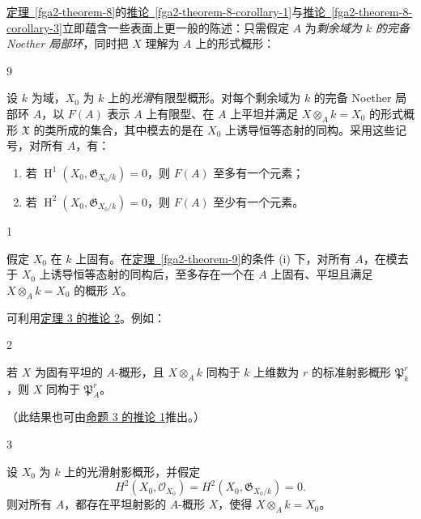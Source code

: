 \par{}\hyperref[fga2-theorem-8]{定理~\ref*{fga2-theorem-8}}的\hyperref[fga2-theorem-8-corollary-1]{推论~\ref*{fga2-theorem-8-corollary-1}}与\hyperref[fga2-theorem-8-corollary-3]{推论~\ref*{fga2-theorem-8-corollary-3}}立即蕴含一些表面上更一般的陈述：只需假定 \(A\) 为\emph{剩余域为 \(k\) 的完备 Noether 局部环}，同时把 \(X\) 理解为 \(A\) 上的形式概形：
\begin{theorem}{9}\label{fga2-theorem-9}\skipsinglepar
\par{}设 \(k\) 为域，\(X_0\) 为 \(k\) 上的\emph{光滑}有限型概形。对每个剩余域为 \(k\) 的完备 Noether 局部环 \(A\)，以 \(F(A)\) 表示 \(A\) 上有限型、在 \(A\) 上平坦并满足 \(X\otimes _Ak=X_0\) 的形式概形 \(\mathfrak {X}\) 的类所成的集合，其中模去的是在 \(X_0\) 上诱导恒等态射的同构。采用这些记号，对所有 \(A\)，有：
\begin{enumerate}
      
 \item[i.]若 \(\operatorname {H}^1(X_0,\mathfrak {G}_{X_0/k})=0\)，则 \(F(A)\) 至多有一个元素；

      
 \item[ii.]若 \(\operatorname {H}^2(X_0,\mathfrak {G}_{X_0/k})=0\)，则 \(F(A)\) 至少有一个元素。

    \end{enumerate}\end{theorem}
\begin{corollary}{1}\label{fga2-theorem-9-corollary-1}\skipsinglepar
\par{}假定 \(X_0\) 在 \(k\) 上固有。在\hyperref[fga2-theorem-9]{定理~\ref*{fga2-theorem-9}}的条件 (i) 下，对所有 \(A\)，在模去于 \(X_0\) 上诱导恒等态射的同构后，至多存在一个在 \(A\) 上固有、平坦且满足 \(X\otimes _Ak=X_0\) 的概形 \(X\)。\end{corollary}
\par{}可利用\hyperref[fga2-theorem-3-corollary-2]{定理 3 的推论 2}。例如：
\begin{corollary}{2}\label{fga2-theorem-9-corollary-2}\skipsinglepar
\par{}若 \(X\) 为固有平坦的 \(A\)-概形，且 \(X\otimes _A k\) 同构于 \(k\) 上维数为 \(r\) 的标准射影概形 \(\mathfrak {P}_k^r\)，则 \(X\) 同构于 \(\mathfrak {P}_A^r\)。\end{corollary}
\par{}（此结果也可由\hyperref[fga2-proposition-3-corollary-1]{命题 3 的推论 1}推出。）
\begin{corollary}{3}\label{fga2-theorem-9-corollary-3}\skipsinglepar
\par{}设 \(X_0\) 为 \(k\) 上的光滑射影概形，并假定 \[       H^2(X_0,\mathcal {O}_{X_0})       = H^2(X_0,\mathfrak {G}_{X_0/k})       = 0.     \] 则对所有 \(A\)，都存在平坦射影的 \(A\)-概形 \(X\)，使得 \(X\otimes _Ak=X_0\)。\end{corollary}
